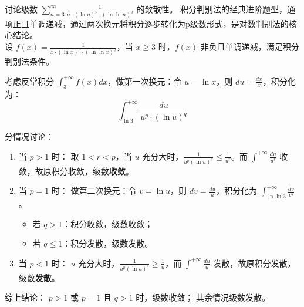 \documentclass[UTF8,zihao=-4,openany]{ctexbook}
\begin{document}
\begin{example}{}{}
讨论级数 $\sum_{n=3}^\infty \frac{1}{n \cdot (\ln n)^p \cdot (\ln \ln n)^q}$ 的敛散性。
\tcblower
积分判别法的经典进阶题型，通项正且单调递减，通过两次换元将积分逐步转化为p级数形式，是对数判别法的核心结论。\\
设 $f(x) = \frac{1}{x \cdot (\ln x)^p \cdot (\ln \ln x)^q}$，当 $x \geq 3$ 时，$f(x)$ 非负且单调递减，满足积分判别法条件。

考虑反常积分 $\int_3^{+\infty} f(x) dx$，做第一次换元：令 $u = \ln x$，则 $du = \frac{dx}{x}$，积分化为：
$$
\int_{\ln 3}^{+\infty} \frac{du}{u^p \cdot (\ln u)^q}
$$

分情况讨论：
\begin{enumerate}
    \item 当 $p > 1$ 时：
    取 $1 < r < p$，当 $u$ 充分大时，$\frac{1}{u^p (\ln u)^q} \leq \frac{1}{u^r}$。而 $\int^{+\infty} \frac{du}{u^r}$ 收敛，故原积分收敛，级数\textbf{收敛}。

    \item 当 $p = 1$ 时：
    做第二次换元：令 $v = \ln u$，则 $dv = \frac{du}{u}$，积分化为 $\int_{\ln \ln 3}^{+\infty} \frac{dv}{v^q}$。
    \begin{itemize}
        \item 若 $q > 1$：积分收敛，级数收敛；
        \item 若 $q \leq 1$：积分发散，级数发散。
    \end{itemize}

    \item 当 $p < 1$ 时：
    $u$ 充分大时，$\frac{1}{u^p (\ln u)^q} \geq \frac{1}{u}$，而 $\int^{+\infty} \frac{du}{u}$ 发散，故原积分发散，级数\textbf{发散}。
\end{enumerate}

综上结论：
$p>1$ 或 $p=1$ 且 $q>1$ 时，级数收敛；
其余情况级数发散。
\end{example}
\end{document}
